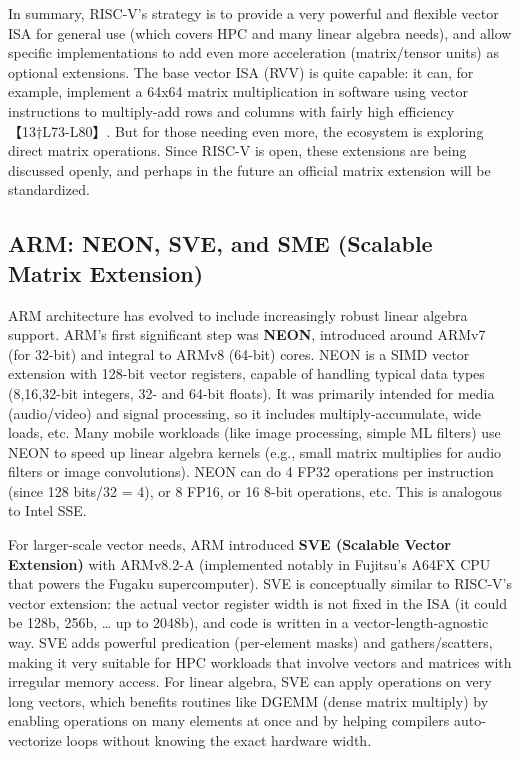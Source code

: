 In summary, RISC-V’s strategy is to provide a very powerful and flexible vector ISA for general use (which covers HPC and many linear algebra needs), and allow specific implementations to add even more acceleration (matrix/tensor units) as optional extensions. The base vector ISA (RVV) is quite capable: it can, for example, implement a 64x64 matrix multiplication in software using vector instructions to multiply-add rows and columns with fairly high efficiency【13†L73-L80】. But for those needing even more, the ecosystem is exploring direct matrix operations. Since RISC-V is open, these extensions are being discussed openly, and perhaps in the future an official matrix extension will be standardized.

\subsection{ARM: NEON, SVE, and SME (Scalable Matrix Extension)}  
ARM architecture has evolved to include increasingly robust linear algebra support. ARM’s first significant step was \textbf{NEON}, introduced around ARMv7 (for 32-bit) and integral to ARMv8 (64-bit) cores. NEON is a SIMD vector extension with 128-bit vector registers, capable of handling typical data types (8,16,32-bit integers, 32- and 64-bit floats). It was primarily intended for media (audio/video) and signal processing, so it includes multiply-accumulate, wide loads, etc. Many mobile workloads (like image processing, simple ML filters) use NEON to speed up linear algebra kernels (e.g., small matrix multiplies for audio filters or image convolutions). NEON can do 4 FP32 operations per instruction (since 128 bits/32 = 4), or 8 FP16, or 16 8-bit operations, etc. This is analogous to Intel SSE.

For larger-scale vector needs, ARM introduced \textbf{SVE (Scalable Vector Extension)} with ARMv8.2-A (implemented notably in Fujitsu’s A64FX CPU that powers the Fugaku supercomputer). SVE is conceptually similar to RISC-V’s vector extension: the actual vector register width is not fixed in the ISA (it could be 128b, 256b, … up to 2048b), and code is written in a vector-length-agnostic way. SVE adds powerful predication (per-element masks) and gathers/scatters, making it very suitable for HPC workloads that involve vectors and matrices with irregular memory access. For linear algebra, SVE can apply operations on very long vectors, which benefits routines like DGEMM (dense matrix multiply) by enabling operations on many elements at once and by helping compilers auto-vectorize loops without knowing the exact hardware width.

